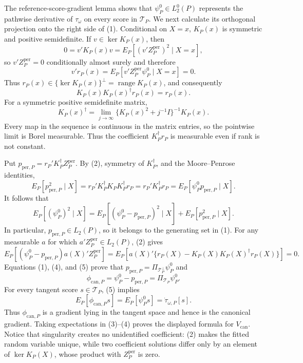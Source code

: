 The reference-score-gradient lemma shows that \(\psi_P^0\in L_2^0(P)\) represents the pathwise derivative of \(\tau_\omega\) on every score in \(\mathcal T_P\).  We next calculate its orthogonal projection onto the right side of (1).  Conditional on \(X=x\), \(K_P(x)\) is symmetric and positive semidefinite.  If \(v\in\ker K_P(x)\), then
\[
0=v'K_P(x)v=E_P[(v'Z_P^{\mathrm{per}})^2\mid X=x],
\]
so \(v'Z_P^{\mathrm{per}}=0\) conditionally almost surely and therefore
\[
v'r_P(x)=E_P[v'Z_P^{\mathrm{per}}\psi_P^0\mid X=x]=0.
\]
Thus \(r_P(x)\in\{\ker K_P(x)\}^\perp=\operatorname{range}K_P(x)\), and consequently
\[
K_P(x)K_P(x)^\dagger r_P(x)=r_P(x).
\tag{2}
\]
For a symmetric positive semidefinite matrix,
\[
K_P(x)^\dagger=\lim_{j\to\infty}\{K_P(x)^2+j^{-1}I\}^{-1}K_P(x).
\]
Every map in the sequence is continuous in the matrix entries, so the pointwise limit is Borel measurable.  Thus the coefficient \(K_P^\dagger r_P\) is measurable even if rank is not constant.

Put \(p_{\mathrm{per},P}=r_P'K_P^\dagger Z_P^{\mathrm{per}}\).  By (2), symmetry of \(K_P^\dagger\), and the Moore--Penrose identities,
\[
E_P[p_{\mathrm{per},P}^2\mid X]
=r_P'K_P^\dagger K_PK_P^\dagger r_P
=r_P'K_P^\dagger r_P
=E_P[\psi_P^0p_{\mathrm{per},P}\mid X].
\tag{3}
\]
It follows that
\[
E_P[(\psi_P^0)^2\mid X]
=E_P[(\psi_P^0-p_{\mathrm{per},P})^2\mid X]
+E_P[p_{\mathrm{per},P}^2\mid X].
\tag{4}
\]
In particular, \(p_{\mathrm{per},P}\in L_2(P)\), so it belongs to the generating set in (1).  For any measurable \(a\) for which \(a'Z_P^{\mathrm{per}}\in L_2(P)\), (2) gives
\[
E_P[(\psi_P^0-p_{\mathrm{per},P})a(X)'Z_P^{\mathrm{per}}]
=E_P[a(X)'\{r_P(X)-K_P(X)K_P(X)^\dagger r_P(X)\}]=0.
\tag{5}
\]
Equations (1), (4), and (5) prove that \(p_{\mathrm{per},P}=\Pi_{\mathcal T_P^\perp}\psi_P^0\) and
\[
\phi_{\mathrm{can},P}=\psi_P^0-p_{\mathrm{per},P}=\Pi_{\mathcal T_P}\psi_P^0.
\]
For every tangent score \(s\in\mathcal T_P\), (5) implies
\[
E_P[\phi_{\mathrm{can},P}s]=E_P[\psi_P^0s]=\dot\tau_{\omega,P}[s].
\]
Thus \(\phi_{\mathrm{can},P}\) is a gradient lying in the tangent space and hence is the canonical gradient.  Taking expectations in (3)--(4) proves the displayed formula for \(V_{\mathrm{can}}\).  Notice that singularity creates no unidentified coefficient: (2) makes the fitted random variable unique, while two coefficient solutions differ only by an element of \(\ker K_P(X)\), whose product with \(Z_P^{\mathrm{per}}\) is zero.

